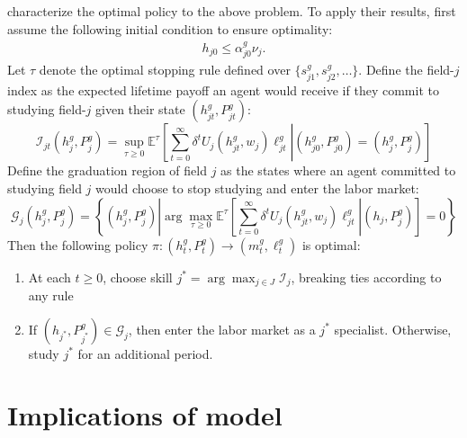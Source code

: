 \documentclass[10 pt]{article}
\newcommand{\toedit}[1]{{\color{gray}#1}}
\newcommand{\toedit}[1]{#1}
\newcommand{\ce}[2]{\left[\left. #1 \right\vert #2 \right]}
\newcommand{\study}{m} %
\begin{document}
\textcite{AF20} characterize the optimal policy to the above problem.
\toedit{To apply their results, first assume the following initial condition to ensure optimality:}
\begin{align}
    h_{j0} \leq \alpha_{j0}^g \nu_{j}. \label{eq:h_leq_alpha_v}
\end{align} 
Let $\tau$ denote the optimal stopping rule defined over $\{s_{j1}^g, s_{j2}^g, \dots\}$. 
Define the field-$j$ index as the expected lifetime payoff an agent would receive if they commit to studying field-$j$ given their state $(h_{jt}^g, P_{jt}^g)$: 
\begin{equation*}
\mathcal{I}_{jt} (h_{j}^g, P_{j}^g) = \sup_{\tau \geq 0} \mathbb{E}^\tau
\ce{
   \sum_{t=0}^\infty \delta^t 
   U_j(h_{jt}^g, w_j) \ell_{jt}^g
}{
    (h_{j0}^g, P_{j0}^g) = (h_{j}^g, P_{j}^g)
}
\end{equation*}
Define the graduation region of field $j$ as the states where an agent committed to studying field $j$ would choose to stop studying and enter the labor market: 
\begin{equation*}
\mathcal{G}_j (h_{j}^g, P_{j}^g)  = 
    \left\{
        (h_{j}^g, P_{j}^g) 
        \left\vert
            \arg \max_{\tau \geq 0} 
            \mathbb{E}^\tau 
            \ce{
                \sum_{t=0}^\infty \delta^t 
                U_j(h_{jt}^g, w_j) \ell_{jt}^g
            }{
                (h_j, P_j^g)
            } = 0
   \right. \right\}
\end{equation*}
Then the following policy $\pi: (h_{t}^g, P_{t}^g) \to (\study_{t}^g, \ell_t^g)$ is optimal: 
\begin{enumerate}
    \item At each $t \geq 0$, choose skill $j^* = \arg \max_{j \in J} \mathcal{I}_j$, breaking ties according to any rule
    \item If $(h_{j^*}, P_{j^*}^g) \in \mathcal{G}_{j}$, then enter the labor market as a $j^*$ specialist. Otherwise, study $j^*$ for an additional period.  
\end{enumerate}


\section{Implications of model}\label{sec:sims}
\end{document}

